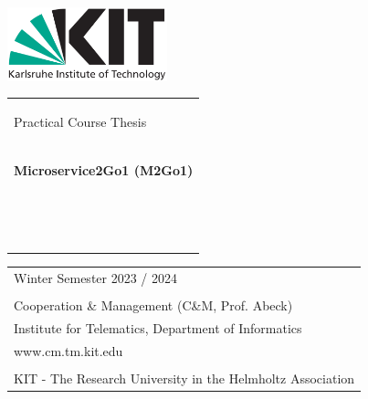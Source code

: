 \begin{titlepage}
\thispagestyle{empty}
\enlargethispage{2cm}

\sffamily
\vspace*{-3.2cm}
\hspace*{-0.6cm}
\includegraphics[height=2.14cm]{figures/kit-logo.png}

\begin{addmargin}{2cm}

\vfill

\begin{tabular}{>{\RaggedRight}p{12cm}}
\begin{center}
{\huge Practical Course Thesis}
\end{center}
\\
\begin{center}
{\textbf{\huge Microservice2Go1 (M2Go1)}}
\end{center}
\\  
\\
\\
\\
\\
\\
   
\\
{M2Go Participant: Felix Weik }  \\
{Semester: 5. Bachelor Semester } \\
\\
\\
{Supervising PhDResearcher: Michael Schneider}  \\
{Supervising SeniorStudent: Frederik Ullrich Klose}  \\
\end{tabular}
\vfill
\vfill
\vfill




\vspace{1em}
\begin{tabular}{ll}
	

	Winter Semester 2023 / 2024 \\
	\\
	\multicolumn{2}{l}{Cooperation \& Management (C\&M, Prof. Abeck)} \\
	\multicolumn{2}{l}{Institute for Telematics, Department of Informatics} \\
	\multicolumn{2}{l}{www.cm.tm.kit.edu} \\
	\\
	\multicolumn{2}{l}{\scriptsize{KIT - The Research University in the Helmholtz Association}}\\
\end{tabular}

\end{addmargin}
\newpage
\thispagestyle{empty}
\end{titlepage}